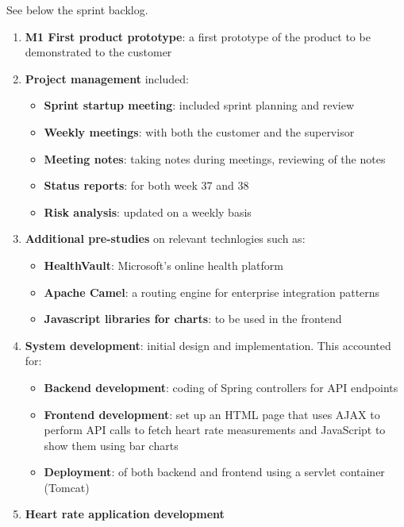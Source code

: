 See below the sprint backlog.
\begin{enumerate}[1.]
	\item \textbf{M1 First product prototype}:\newline
		a first prototype of the product to be demonstrated to the customer
	\item \textbf{Project management} included:
		\begin{itemize}
			\item \textbf{Sprint startup meeting}:
				included sprint planning and review
			\item \textbf{Weekly meetings}:
				with both the customer and the supervisor
			\item \textbf{Meeting notes}:
				taking notes during meetings, reviewing of the notes
			\item \textbf{Status reports}:
				for both week 37 and 38
			\item \textbf{Risk analysis}:
				updated on a weekly basis
		\end{itemize}
	\item \textbf{Additional pre-studies} on relevant technlogies such as:
	\begin{itemize}
		\item \textbf{HealthVault}: Microsoft's online health platform
		\item \textbf{Apache Camel}: a routing engine for enterprise integration patterns
		\item \textbf{Javascript libraries for charts}: to be used in the frontend
	\end{itemize}
	\item \textbf{System development}: initial design and implementation. This accounted for:
	\begin{itemize}
		\item \textbf{Backend development}:
			coding of Spring controllers for API endpoints
		\item \textbf{Frontend development}:
			set up an HTML page that uses AJAX to perform API calls to fetch heart rate measurements
			and JavaScript to show them using bar charts
		\item \textbf{Deployment}:
			of both backend and frontend using a servlet container (Tomcat)
	\end{itemize}
	\item \textbf{Heart rate application development}\newline

\end{enumerate}
